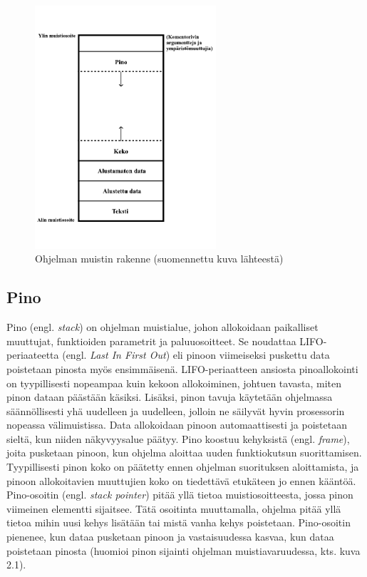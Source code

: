 \begin{figure}[tbh]
{\begin{centering}
\includegraphics[width=0.6\textwidth]{kuvat/muistin_rakenne.pdf}
\par\end{centering}}
\caption{Ohjelman muistin rakenne \cite{mmic2010} (suomennettu kuva lähteestä)}
\end{figure}

\subsection{Pino}

Pino (engl. \textit{stack}) on ohjelman muistialue, johon allokoidaan paikalliset muuttujat, funktioiden parametrit ja paluuosoitteet. Se noudattaa LIFO-periaateetta (engl. \textit{Last In First Out}) eli pinoon viimeiseksi puskettu data poistetaan pinosta myös ensimmäisenä. LIFO-periaatteen ansiosta pinoallokointi on tyypillisesti nopeampaa kuin kekoon allokoiminen, johtuen tavasta, miten pinon dataan päästään käsiksi. Lisäksi, pinon tavuja käytetään ohjelmassa säännöllisesti yhä uudelleen ja uudelleen, jolloin ne säilyvät hyvin prosessorin nopeassa välimuistissa. Data allokoidaan pinoon automaattisesti ja poistetaan sieltä, kun niiden näkyvyysalue päätyy. Pino koostuu kehyksistä (engl. \textit{frame}), joita pusketaan pinoon, kun ohjelma aloittaa uuden funktiokutsun suorittamisen. Tyypillisesti pinon koko on päätetty ennen ohjelman suorituksen aloittamista, ja pinoon allokoitavien muuttujien koko on tiedettävä etukäteen jo ennen kääntöä.\cite{mmic2010}
Pino-osoitin (engl. \textit{stack pointer}) pitää yllä tietoa muistiosoitteesta, jossa pinon viimeinen elementti sijaitsee. Tätä osoitinta muuttamalla, ohjelma pitää yllä tietoa mihin uusi kehys lisätään tai mistä vanha kehys poistetaan. Pino-osoitin pienenee, kun dataa pusketaan pinoon ja vastaisuudessa kasvaa, kun dataa poistetaan pinosta (huomioi pinon sijainti ohjelman muistiavaruudessa, kts. kuva 2.1).\cite{sasp2006}

